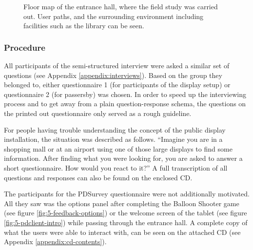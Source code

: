 		\begin{figure}[hb]
		    \begin{center}
		    \end{center}
			 \caption[Floor Map of Entrance Hall]{Floor map of the entrance hall, where the field study was carried out. User paths, and the surrounding environment including facilities such as the library can be seen.}
			 \label{fig:5-entrance-hall}
		\end{figure}




	\subsubsection{Procedure}

		All participants of the semi-structured interview were asked a similar set of questions (see Appendix \ref{appendix:interviews}). Based on the group they belonged to, either questionnaire 1 (for participants of the display setup) or questionnaire 2 (for passersby) was chosen. In order to speed up the interviewing process and to get away from a plain question-response schema, the questions on the printed out questionnaire only served as a rough guideline. 

		For people having trouble understanding the concept of the public display installation, the situation was described as follows. ``Imagine you are in a shopping mall or at an airport using one of those large displays to find some information. After finding what you were looking for, you are asked to answer a short questionnaire. How would you react to it?'' A full transcription of all questions and responses can also be found on the enclosed CD. 

		The participants for the PDSurvey questionnaire were not additionally motivated. All they saw was the options panel after completing the Balloon Shooter game (see figure \ref{fig:5-feedback-options}) or the welcome screen of the tablet (see figure \ref{fig:5-pdclient-intro}) while passing through the entrance hall. A complete copy of what the users were able to interact with, can be seen on the attached CD (see Appendix \ref{appendix:cd-contents}).







